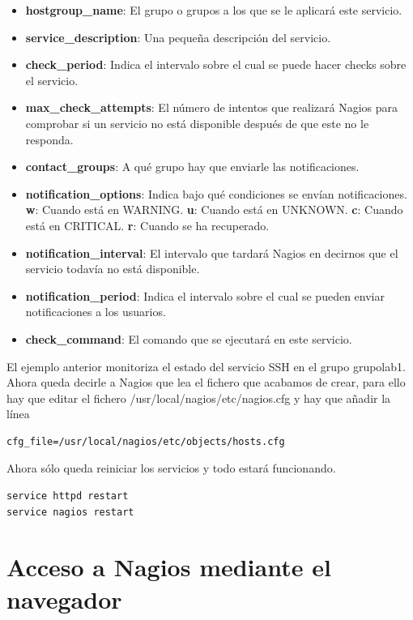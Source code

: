 \documentclass[11pt,a4paper]{article}
\begin{document}
\begin{itemize}
\item \textbf{hostgroup\_name}: El grupo o grupos a los que se le aplicará este servicio.
\item \textbf{service\_description}: Una pequeña descripción del servicio.
\item \textbf{check\_period}: Indica el intervalo sobre el cual se puede hacer checks sobre el servicio.
\item \textbf{max\_check\_attempts}: El número de intentos que realizará Nagios para comprobar si un servicio no está disponible después de que este no le responda.
\item \textbf{contact\_groups}: A qué grupo hay que enviarle las notificaciones.
\item \textbf{notification\_options}: Indica bajo qué condiciones se envían notificaciones. \textbf{w}: Cuando está en WARNING. \textbf{u}: Cuando está en UNKNOWN. \textbf{c}: Cuando está en CRITICAL. \textbf{r}: Cuando se ha recuperado.
\item \textbf{notification\_interval}: El intervalo que tardará Nagios en decirnos que el servicio todavía no está disponible.
\item \textbf{notification\_period}: Indica el intervalo sobre el cual se pueden enviar notificaciones a los usuarios.
\item \textbf{check\_command}: El comando que se ejecutará en este servicio.
\end{itemize}

El ejemplo anterior monitoriza el estado del servicio SSH en el grupo grupolab1.
\\

Ahora queda decirle a Nagios que lea el fichero que acabamos de crear, para ello hay que editar el fichero /usr/local/nagios/etc/nagios.cfg y hay que añadir la línea

\begin{verbatim}
cfg_file=/usr/local/nagios/etc/objects/hosts.cfg
\end{verbatim}

Ahora sólo queda reiniciar los servicios y todo estará funcionando.

\begin{verbatim}
service httpd restart
service nagios restart
\end{verbatim}

\section{Acceso a Nagios mediante el navegador}
\end{document}
